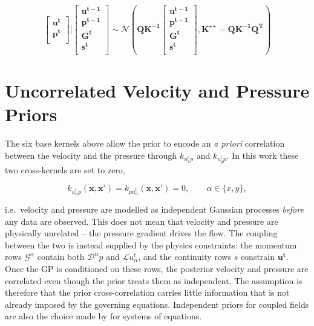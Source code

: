 \documentclass[11pt, a4paper]{report}
\begin{document}
\begin{equation}
\begin{bmatrix}
    \boldsymbol{u^{t}} \\
    \boldsymbol{p^{t}} \\
\end{bmatrix}
\bigg|
\begin{bmatrix}
    \boldsymbol{u^{t-1}} \\
    \boldsymbol{p^{t-1}} \\
    \boldsymbol{{G}^{t}} \\
    \boldsymbol{s^t} \\
\end{bmatrix}
\sim\mathcal{N}\left(
    \boldsymbol{Q K^{-1}} \begin{bmatrix} \boldsymbol{u^{t-1}} \\ \boldsymbol{p^{t-1}} \\ \boldsymbol{{G}^{t}} \\ \boldsymbol{s^t} \\\end{bmatrix}, 
    \boldsymbol{K^{\star \star}} - \boldsymbol{Q K^{-1} Q^T}
    \right)
    \label{eq:posterior-generic}
\end{equation}

\section{Uncorrelated Velocity and Pressure Priors}%
\label{sec:zero-up}
 
The six base kernels above allow the prior to encode an \emph{a priori} correlation between
the velocity and the pressure through \(k_{u^{t}_x p}\) and \(k_{u^{t}_y p}\). In this work these two
cross-kernels are set to zero,
 
\begin{equation}
    k_{u^{t}_\alpha p}(\boldsymbol{x},\boldsymbol{x}') = k_{p u^{t}_\alpha}(\boldsymbol{x},\boldsymbol{x}') = 0,
    \qquad \alpha \in \{x, y\},
    \label{eq:zero-up}
\end{equation}
 
\noindent i.e.\ velocity and pressure are modelled as independent Gaussian processes \emph{before}
any data are observed. This does not mean that velocity and pressure are physically unrelated --
the pressure gradient drives the flow. The coupling between the two is instead supplied by the
physics constraints: the momentum rows \(\mathcal{G}^\alpha\) contain both
\(\mathcal{D}^\alpha p\) and \(\mathcal{L}u^{t}_\alpha\), and the continuity rows \(s\) constrain \(\boldsymbol{u^{t}}\).
Once the GP is conditioned on these rows, the posterior velocity and pressure are correlated even
though the prior treats them as independent. The assumption is therefore that the prior
cross-correlation carries little information that is not already imposed by the governing equations.
Independent priors for coupled fields are also the choice made by \textcite{Raissi2018} for
systems of equations.
 
\end{document}
